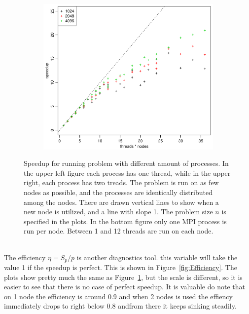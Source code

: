 \begin{figure}[h!]
  \quad
  \begin{subfigure}[b]{0.48\textwidth}
    \includegraphics[width=\textwidth]{./Figures/taskbSpeedupNodesTimesThreads.pdf}
  \end{subfigure}
  \vspace{-0.1\baselineskip}
  \caption{Speedup for running problem with different amount of processes. In the upper left figure each process has one thread, while in the upper right, each process has two treads. The problem is run on as few nodes as possible, and the processes are identically distributed among the nodes. There are drawn vertical lines to show when a new node is utilized, and a line with slope 1. The problem size $n$ is specified in the plots. In the bottom figure only one MPI process is run per node. Between 1 and 12 threads are run on each node.}
  \label{fig:Speedup}
\end{figure}
%
\\
The efficiency $\eta = S_p/p $ is another diagnostics tool. this variable will take the value 1 if the speedup is perfect. This is shown in Figure~\ref{fig:Efficiency}. The plots show pretty much the same as Figure~\ref{fig:Speedup}, but the scale is different, so it is easier to see that there is no case of perfect speedup. It is valuable do note that on 1 node the efficiency is around 0.9 and when 2 nodes is used the effiency immediately drops to right below 0.8 andfrom there it keeps sinking steadily. 
\\
